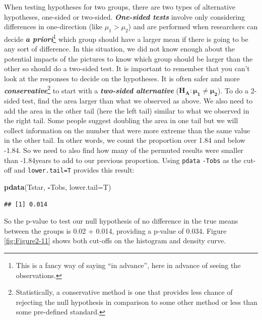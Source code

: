 \documentclass[]{book}
\newenvironment{Shaded}{\begin{snugshade}}{\end{snugshade}}
\newcommand{\KeywordTok}[1]{\textcolor[rgb]{0.13,0.29,0.53}{\textbf{#1}}}
\newcommand{\DataTypeTok}[1]{\textcolor[rgb]{0.13,0.29,0.53}{#1}}
\newcommand{\OperatorTok}[1]{\textcolor[rgb]{0.81,0.36,0.00}{\textbf{#1}}}
\newcommand{\NormalTok}[1]{#1}
\let\rmarkdownfootnote\footnote%
\def\footnote{\protect\rmarkdownfootnote}
\theoremstyle{definition}
\theoremstyle{definition}
\theoremstyle{remark}
\begin{document}
When testing hypotheses for two groups, there are two types of
alternative hypotheses, one-sided or two-sided. \textbf{\emph{One-sided
tests}} involve only considering differences in one-direction (like
\(\mu_1 > \mu_2\)) and are performed when researchers can decide
\textbf{\emph{a priori}}\footnote{This is a fancy way of saying ``in
  advance'', here in advance of seeing the observations.} which group
should have a larger mean if there is going to be any sort of
difference. In this situation, we did not know enough about the
potential impacts of the pictures to know which group should be larger
than the other so should do a two-sided test. It is important to
remember that you can't look at the responses to decide on the
hypotheses. It is often safer and more
\textbf{\emph{conservative}}\footnote{Statistically, a conservative
  method is one that provides less chance of rejecting the null
  hypothesis in comparison to some other method or less than some
  pre-defined standard.} to start with a \textbf{\emph{two-sided
alternative}} (\(\mathbf{H_A: \mu_1 \ne \mu_2}\)). To do a 2-sided test,
find the area larger than what we observed as above. We also need to add
the area in the other tail (here the left tail) similar to what we
observed in the right tail. Some people suggest doubling the area in one
tail but we will collect information on the number that were more
extreme than the same value in the other tail. In other words, we count
the proportion over 1.84 and below -1.84. So we need to also find how
many of the permuted results were smaller than -1.84years to add to our
previous proportion. Using \texttt{pdata} \texttt{-Tobs} as the cut-off
and \texttt{lower.tail=T} provides this result:

\begin{Shaded}
\begin{Highlighting}[]
\KeywordTok{pdata}\NormalTok{(Tstar, }\OperatorTok{-}\NormalTok{Tobs, }\DataTypeTok{lower.tail=}\NormalTok{T)}
\end{Highlighting}
\end{Shaded}

\begin{verbatim}
## [1] 0.014
\end{verbatim}

So the p-value to test our null hypothesis of no difference in the true
means between the groups is 0.02 + 0.014, providing a p-value of 0.034.
Figure \ref{fig:Figure2-11} shows both cut-offs on the histogram and
density curve.
\end{document}
